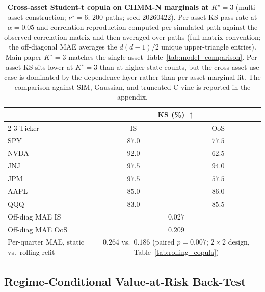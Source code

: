 \begin{table}[t]
\centering
\caption{\textbf{Cross-asset Student-t copula on CHMM-N marginals at $K^\star = 3$} (multi-asset construction; $\nu^\star = 6$; $200$ paths; seed $20260422$). Per-asset KS pass rate at $\alpha = 0.05$ and correlation reproduction computed per simulated path against the observed correlation matrix and then averaged over paths (full-matrix convention; the off-diagonal MAE averages the $d(d-1)/2$ unique upper-triangle entries). Main-paper $K^\star = 3$ matches the single-asset Table~\ref{tab:model_comparison}. Per-asset KS sits lower at $K^\star = 3$ than at higher state counts, but the cross-asset use case is dominated by the dependence layer rather than per-asset marginal fit. The comparison against SIM, Gaussian, and truncated C-vine is reported in the appendix.}
\label{tab:cross_asset}
\small
\begin{tabular}{l cc}
\toprule
& \multicolumn{2}{c}{KS (\%) $\uparrow$} \\
\cmidrule(lr){2-3}
Ticker & IS & OoS \\
\midrule
SPY   & $87.0$  & $77.5$ \\
NVDA  & $92.0$  & $62.5$ \\
JNJ   & $97.5$  & $94.0$ \\
JPM   & $97.5$  & $57.5$ \\
AAPL  & $85.0$  & $86.0$ \\
QQQ   & $83.0$  & $85.5$ \\
\midrule
Off-diag MAE IS         & \multicolumn{2}{c}{$0.027$} \\
Off-diag MAE OoS        & \multicolumn{2}{c}{$0.209$} \\
Per-quarter MAE, static vs.\ rolling refit & \multicolumn{2}{c}{$0.264$ vs.\ $\mathbf{0.186}$ (paired $p = 0.007$; $2 \times 2$ design, Table~\ref{tab:rolling_copula})} \\
\bottomrule
\end{tabular}
\end{table}

\subsection{Regime-Conditional Value-at-Risk Back-Test}

